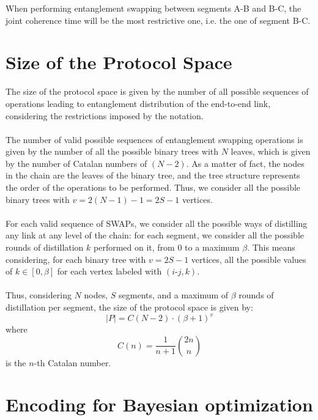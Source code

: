 \documentclass{article}
\begin{document}
When performing entanglement swapping between segments A-B and B-C, the joint coherence time will be the most restrictive one, i.e. the one of segment B-C.

\section*{Size of the Protocol Space}

The size of the protocol space is given by the number of all possible sequences of operations leading to entanglement distribution of the end-to-end link, considering the restrictions imposed by the notation.
\\\\
The number of valid possible sequences of entanglement swapping operations is given by the number of all the possible binary trees with $N$ leaves, which is given by the number of Catalan numbers of $(N-2)$. As a matter of fact, the nodes in the chain are the leaves of the binary tree, and the tree structure represents the order of the operations to be performed.
Thus, we consider all the possible binary trees with $v = 2(N-1) - 1 = 2S - 1$ vertices.
\\\\
For each valid sequence of SWAPs, we consider all the possible ways of distilling any link at any level of the chain: for each segment, we consider all the possible rounds of distillation $k$ performed on it, from 0 to a maximum $\beta$. 
This means considering, for each binary tree with $v = 2S - 1$ vertices, all the possible values of $k \in [0, \beta]$ for each vertex labeled with $(i\text{-}j, k)$.
\\\\
Thus, considering $N$ nodes, $S$ segments, and a maximum of $\beta$ rounds of distillation per segment, the size of the protocol space is given by:
\begin{equation}
    |P| = C(N-2) \cdot (\beta+1)^v
\end{equation}
where
\begin{equation}
  C(n) = \frac{1}{n+1} \binom{2n}{n}
\end{equation}
is the $n$-th Catalan number.

\clearpage
\section*{Encoding for Bayesian optimization}
\end{document}
